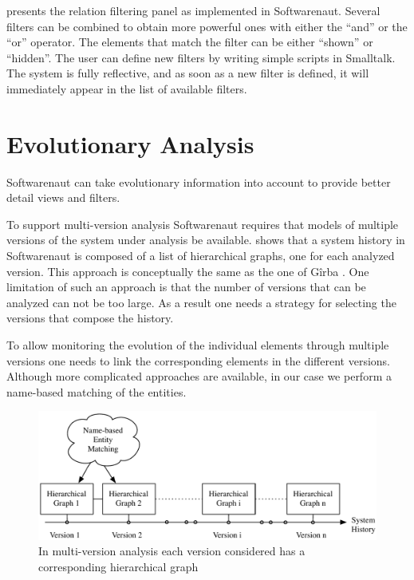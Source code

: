 \documentclass[preprint,12pt]{elsarticle}
\begin{document}
 presents the relation filtering panel as implemented in Softwarenaut. Several filters can be combined to obtain more powerful ones with either the ``and'' or the ``or'' operator. The elements that match the filter can be either ``shown'' or ``hidden''. The user can define new filters by writing simple scripts in Smalltalk. The system is fully reflective, and as soon as a new filter is defined, it will immediately appear in the list of available filters.

\section {Evolutionary Analysis} 

Softwarenaut can take evolutionary information into account to provide better detail views and filters.

To support multi-version analysis Softwarenaut requires that models of multiple versions of the system under analysis be available.  shows that a system history in Softwarenaut is composed of a list of hierarchical graphs, one for each analyzed version. This approach is conceptually the same as the one of G{\^i}rba \cite{girba-thesis}. One limitation of such an approach is that the number of versions that can be analyzed can not be too large. As a result one needs a strategy for selecting the versions that compose the history.

To allow monitoring the evolution of the individual elements through multiple versions one needs to link the corresponding elements in the different versions. Although more complicated approaches are available, in our case we perform a name-based matching of the entities.

\begin{figure}[ht]
\begin{center}
\includegraphics[width=\linewidth]{images/MultiVersionAnalysis}
\caption{In multi-version analysis each version considered has a corresponding hierarchical graph}
\end{center}
\end{figure}
\end{document}
